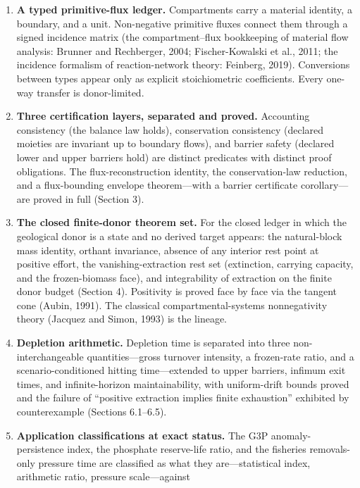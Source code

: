 \documentclass[11pt]{article}
\begin{document}
\begin{enumerate}
\def\labelenumi{\arabic{enumi}.}
\item
  \textbf{A typed primitive-flux ledger.} Compartments carry a material
  identity, a boundary, and a unit. Non-negative primitive fluxes
  connect them through a signed incidence matrix (the compartment--flux
  bookkeeping of material flow analysis: Brunner and Rechberger, 2004;
  Fischer-Kowalski et al., 2011; the incidence formalism of
  reaction-network theory: Feinberg, 2019). Conversions between types
  appear only as explicit stoichiometric coefficients. Every one-way
  transfer is donor-limited.
\item
  \textbf{Three certification layers, separated and proved.} Accounting
  consistency (the balance law holds), conservation consistency
  (declared moieties are invariant up to boundary flows), and barrier
  safety (declared lower and upper barriers hold) are distinct
  predicates with distinct proof obligations. The flux-reconstruction
  identity, the conservation-law reduction, and a flux-bounding envelope
  theorem---with a barrier certificate corollary---are proved in
  full (Section 3).
\item
  \textbf{The closed finite-donor theorem set.} For the closed ledger in
  which the geological donor is a state and no derived target appears:
  the natural-block mass identity, orthant invariance, absence of any
  interior rest point at positive effort, the vanishing-extraction rest
  set (extinction, carrying capacity, and the frozen-biomass face), and
  integrability of extraction on the finite donor budget (Section 4).
  Positivity is proved face by face via the tangent cone (Aubin, 1991).
  The classical compartmental-systems nonnegativity theory (Jacquez and
  Simon, 1993) is the lineage.
\item
  \textbf{Depletion arithmetic.} Depletion time is separated into three
  non-interchangeable quantities---gross turnover intensity, a
  frozen-rate ratio, and a scenario-conditioned hitting time---extended to upper barriers, infimum exit times, and infinite-horizon
  maintainability, with uniform-drift bounds proved and the failure of
  ``positive extraction implies finite exhaustion'' exhibited by
  counterexample (Sections 6.1--6.5).
\item
  \textbf{Application classifications at exact status.} The G3P
  anomaly-persistence index, the phosphate reserve-life ratio, and the
  fisheries removals-only pressure time are classified as what they are---statistical index, arithmetic ratio, pressure scale---against

\end{enumerate}
\end{document}
